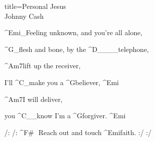 \begin{song}{title=\centering Personal Jesus \\\normalsize Johnny Cash  \vspace*{-0.3cm}}
{\begin{minipage}[t]{0.48\textwidth}
\sloka
	^{Emi{\color{white}\_}}Feeling unknown, and you're all alone,

	^{G{\color{white}\_}}flesh and bone, by the ^{D{\color{white}\_\_\_\_}}telephone,

	^{Am7}lift up the receiver,

	I'll ^{C{\color{white}\_}}make you a ^{G}believer, ^{Emi}

	^{Am7}I will deliver,
	
	you ^{C{\color{white}\_\_}}know I'm a ^{G}forgiver. ^{Emi}


	/: /: ^{F\#\,\,\,\,}Reach out and touch ^{Emi}faith. :/ :/

\end{minipage}
}
\setcounter{Slokočet}{0}
\end{song}

	